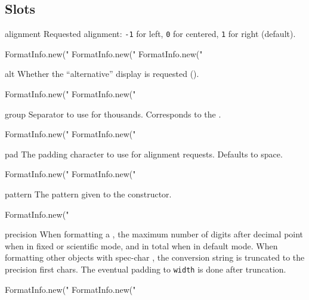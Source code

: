 \subsection{Slots}
\begin{urbiscriptapi}
\item[alignment]
  Requested alignment: \lstinline|-1| for left, \lstinline|0| for
  centered, \lstinline|1| for right (default).
\begin{urbiassert}
FormatInfo.new("%
FormatInfo.new("%
FormatInfo.new("%
\end{urbiassert}


\item[alt]
  Whether the ``alternative'' display is requested (\samp{\#}).
\begin{urbiassert}
FormatInfo.new("%
FormatInfo.new("%
\end{urbiassert}


\item[group]
  Separator to use for thousands.  Corresponds to the 
  .
\begin{urbiassert}
FormatInfo.new("%
FormatInfo.new("%
\end{urbiassert}


\item[pad]
  The padding character to use for alignment requests.  Defaults to space.
\begin{urbiassert}
FormatInfo.new("%
FormatInfo.new("%
\end{urbiassert}


\item[pattern]
  The pattern given to the constructor.
\begin{urbiassert}
FormatInfo.new("%
\end{urbiassert}


\item[precision]
  When formatting a , the maximum number of digits
  after decimal point when in fixed or scientific mode, and in total
  when in default mode.  When formatting other objects with spec-char
  , the conversion string is truncated to the precision first
  chars. The eventual padding to \lstinline|width| is done after
  truncation.
\begin{urbiassert}
FormatInfo.new("%
FormatInfo.new("%
\end{urbiassert}



\end{urbiscriptapi}
